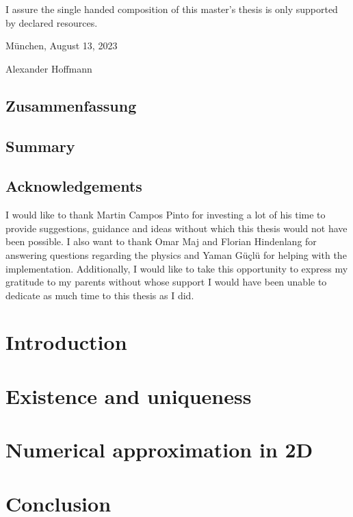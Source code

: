 \documentclass[12pt,a4paper,times]{report}
\numberwithin{equation}{section}
\numberwithin{figure}{section}
\numberwithin{lemma}{section}
\theoremstyle{definition}
\begin{document}
\noindent I assure the single handed composition of this master's thesis is only supported by declared resources.
\bigskip

\noindent München, August 13, 2023 \par
\vspace{2,5cm}
 
\noindent\hspace{1cm} Alexander Hoffmann
    \vspace{1cm}
\newpage
\thispagestyle{empty}
\section*{Zusammenfassung}

\vspace{1cm}
\section*{Summary}

\newpage

\thispagestyle{empty}
\section*{Acknowledgements}
I would like to thank Martin Campos Pinto for investing a lot of his time 
to provide suggestions, guidance and ideas without which this thesis would not have 
been possible. I also want to thank Omar Maj and Florian Hindenlang for answering questions regarding the physics 
and Yaman Güçlü for helping with the implementation. Additionally, I would like to take 
this opportunity to express my gratitude to my parents without whose support I would have 
been unable to dedicate as much time to this thesis as I did.
\newpage

\tableofcontents
\newpage
{}
\setcounter{page}{1}

\chapter*{Introduction}\label{chap:introduction}

\chapter{Existence and uniqueness}\label{chap:existence_and_uniqueness}

\chapter{Numerical approximation in 2D}\label{chap:approximation_in_2D}

\chapter*{Conclusion}\label{chap:conclusion}

\printbibliography
\end{document}
